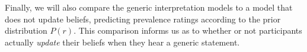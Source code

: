 \documentclass[floatsintext,doc]{apa6}
\begin{document}
Finally, we will also compare the generic interpretation models to a model that does not update beliefs, predicting prevalence ratings according to the prior distribution \(P(r)\).
This comparison informs us as to whether or not participants actually \emph{update} their beliefs when they hear a generic statement.


%
%
%
%
%
%
%
\end{document}
